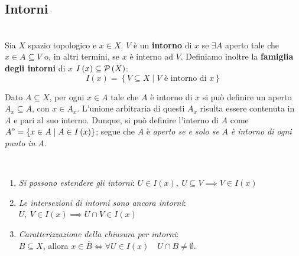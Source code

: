 \subsection{Intorni}
\begin{define}[Intorno.]~{}\\
Sia $X$ spazio topologico e $x\in X$. $V$ è un \textbf{intorno} di $x$ se $\exists A$ aperto tale che $x\in A\subseteq V$ o, in altri termini, se $x$ è interno ad $V$.
Definiamo inoltre la \textbf{famiglia degli intorni} di $x$ $I\left(x\right)\subseteq\mathcal{P}\left(X\right)$:
\begin{equation}
I\left(x\right)=\left\{V\subseteq X\mid V\text{ è intorno di }x \right\}
\end{equation}
\vspace{-6mm}
\end{define}
\begin{observe}
	Dato $A\subseteq X$, per ogni $x\in A$ tale che $A$ è intorno di $x$ si può definire un aperto $A_x\subseteq A$, con $x\in A_x$. L'unione arbitraria di questi $A_x$ risulta essere contenuta in $A$ e pari al suo interno. Dunque, si può definire l'interno di $A$ come ${\kern0ptA}^{\mathrm{o}}=\left\{x\in A\mid A\in I\left(x\right)\right\}$; segue che $A$ è \textit{aperto se e solo se} $A$ \textit{è intorno di ogni punto in} $A$.
\end{observe}
\begin{lemming}~{}
\begin{enumerate}
\item \textit{Si possono estendere gli intorni}: $U\in I\left(x\right),\ U\subseteq V\implies V\in I\left(x\right)$
\item \textit{Le intersezioni di intorni sono ancora intorni}: $U,\ V\in I\left(x\right)\implies U\cap V\in I\left(x\right)$
\item \textit{Caratterizzazione della chiusura per intorni}:\\$B\subseteq X$, allora $x\in\overline{B}\iff\forall U\in I\left(x\right)\quad U\cap B\neq \emptyset$.
\end{enumerate}
\vspace{-3mm}
\end{lemming}
